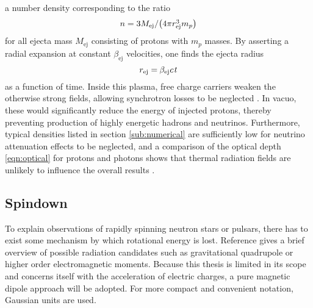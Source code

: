 a number density corresponding to the ratio
\begin{equation}
	\cramped{n = 3 M_\text{ej} / \bigl( 4\pi r_\text{ej}^3 m_p \bigr)} \kern+0.5pt
	\label{eqn:number-density}
\end{equation}
for all ejecta mass $M_\text{ej}$ consisting of protons with $m_p$ masses. By asserting a radial expansion at constant
$\beta_\text{ej}$ velocities, one finds the ejecta radius
\begin{equation}
	r_\text{ej} = \kern-0.4pt \beta_\text{ej} \kern+0.1pt c \kern+1.0pt t
	\label{eqn:ejecta-radius}
\end{equation}
as a function of time. Inside this plasma, free charge carriers weaken the otherwise strong fields, allowing synchrotron losses to be
neglected \cite{Carpio_2020}. In vacuo, these would significantly reduce the energy of injected protons, thereby preventing production
of highly energetic hadrons and neutrinos. Furthermore, typical densities listed in section \ref{sub:numerical} are sufficiently low for
neutrino attenuation effects to be neglected, and a comparison of the optical depth \eqref{eqn:optical} for protons and photons shows that
thermal radiation fields are unlikely to influence the overall results \cite{Carpio_2020}.


\enlargethispage*{2\baselineskip}\newpage


\subsection{Spindown}
\label{sub:spindown}

To explain observations of rapidly spinning neutron stars or pulsars, there has to exist some mechanism by which rotational energy is
lost. Reference \cite{Alvarez_2004} gives a brief overview of possible radiation candidates such as gravitational quadrupole or
higher order electromagnetic moments. Because this thesis is limited in its scope and concerns itself with the acceleration of
electric charges, a pure magnetic dipole approach will be adopted. For more compact and convenient notation, Gaussian units are used.

